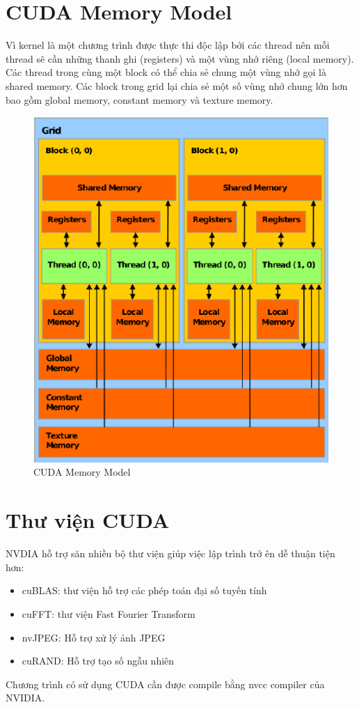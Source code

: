 \documentclass[../../main.tex]{subfiles}
\begin{document}
\section{CUDA Memory Model}
Vì kernel là một chương trình được thực thi độc lập bởi các thread nên mỗi thread sẽ cần những thanh ghi (registers) và một vùng nhớ riêng (local memory). Các thread trong cùng một block có thể chia sẻ chung một vùng nhớ gọi là shared memory. Các block trong grid lại chia sẻ một số vùng nhớ chung lớn hơn bao gồm global memory, constant memory và texture memory.
\begin{figure}[H]
    \begin{center}
        \includegraphics[scale=0.5]{CUDA-memory-model-from-7.png}
    \end{center}
    \caption{CUDA Memory Model}
    \label{fig:CUDA Memory Model}
\end{figure}

\section{Thư viện CUDA}
NVDIA hỗ trợ săn nhiều bộ thư viện giúp việc lập trình trở ên dễ  thuận tiện hơn:
\begin{itemize}
    \item cuBLAS: thư viện hỗ  trợ các phép toán đại số tuyến tính
    \item cuFFT: thư viện Fast Fourier Transform
    \item nvJPEG: Hỗ  trợ xử lý ảnh JPEG
    \item cuRAND: Hỗ trợ tạo số ngẫu nhiên
\end{itemize}
Chương trình có sử dụng CUDA cần được compile bằng nvcc compiler của NVIDIA.
\end{document}
